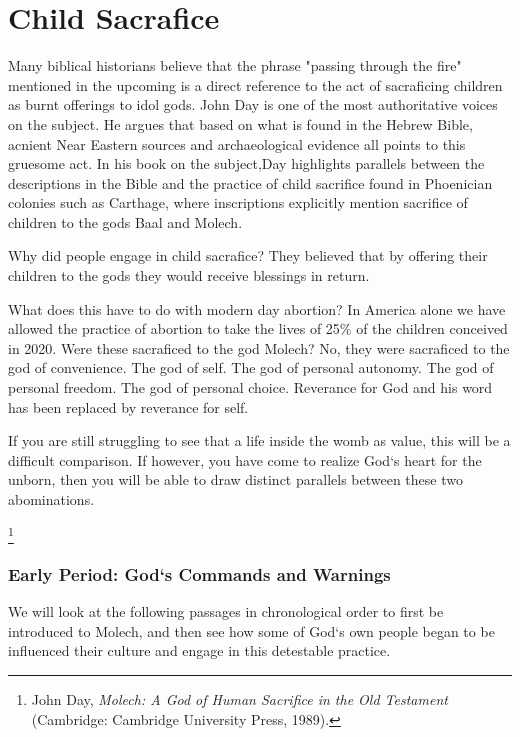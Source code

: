 \chapter{Child Sacrafice}

\begin{fullwidth}
    
Many biblical historians believe that the phrase "passing through the fire" mentioned in the upcoming is a direct reference to the act of sacraficing children
as burnt offerings to idol gods. John Day is one of the most authoritative voices on the subject. He argues that based on what is found in the Hebrew Bible, acnient Near Eastern sources and archaeological evidence 
all points to this gruesome act. In his book on the subject,Day highlights parallels between the descriptions
in the Bible and the practice of child sacrifice found in Phoenician colonies such as Carthage, where inscriptions explicitly mention sacrifice of children to the gods Baal and Molech. 

Why did people engage in child sacrafice? They believed that by offering their children to the gods they would receive blessings in return.

What does this have to do with modern day abortion? In America alone we have allowed the practice of abortion to take the lives of 25\% of the children conceived in 2020. Were these
sacraficed to the god Molech? No, they were sacraficed to the god of convenience. The god of self. The god of personal autonomy. The god of personal freedom. The god of personal choice. Reverance for God and his word 
has been replaced by reverance for self. 

If you are still struggling to see that a life inside the womb as value, this will be a difficult comparison. If however, you have come to realize God`s heart for the unborn, then you will be able to draw distinct parallels between these two abominations.
\end{fullwidth}
\footnote{John Day, \textit{Molech: A God of Human Sacrifice in the Old Testament} (Cambridge: Cambridge University Press, 1989).} 






\pagebreak
\subsection{Early Period: God`s Commands and Warnings}
We will look at the following passages
in chronological order to first be introduced to Molech, and then see how some of God`s own people began to be influenced their culture and engage in this detestable practice.


